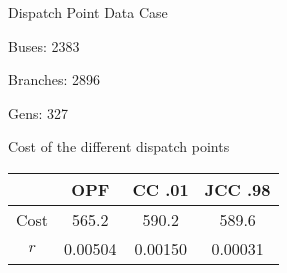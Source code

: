 \begin{frame}{Dispatch Point Data}
Case
\bi
\item Buses: 2383
\item Branches: 2896
\item Gens: 327
\ei

Cost of the different dispatch points
\begin{center}
 \begin{tabular}{ |c| c c c |}
\hline
& OPF & CC .01 & JCC .98 \\
\hline
\hline
Cost & 565.2 & 590.2 & 589.6 \\
$r$ & 0.00504 & 0.00150 & 0.00031 \\
\hline
\end{tabular}
\end{center}
\end{frame}

